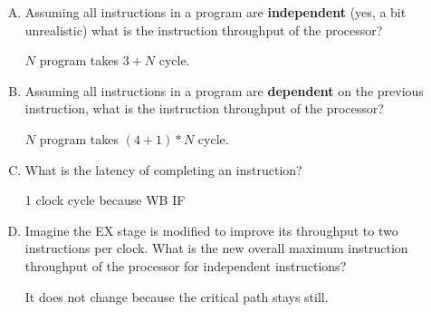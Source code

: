 \documentclass[11pt]{article}
\newenvironment{choice}{\begin{enumerate}[A.]}{\end{enumerate}}
\newenvironment{answer2}{\begin{minipage}[c][0.5in]{\textwidth}}{\end{minipage}}
\begin{document}
\begin{choice}
\item  
Assuming all instructions in a program are \textbf{independent} (yes, a bit unrealistic) what is the instruction throughput of the processor?

\begin{answer2}
$N$ program takes $3+N$ cycle.
\end{answer2}
\item
Assuming all instructions in a program are \textbf{dependent} on the previous instruction, what is the instruction throughput of the processor?

\begin{answer2}
$N$ program takes $(4+1)*N$ cycle.
\end{answer2}
\item What is the latency of completing an instruction?

\begin{answer2}
1 clock cycle because WB \textvisiblespace IF
\end{answer2}
\item Imagine the EX stage is modified to improve its throughput to two instructions per clock. What is the new overall maximum instruction throughput of the processor for independent instructions?

\begin{answer2}
It does not change because the critical path stays still.
\end{answer2}

\end{choice}
\end{document}
